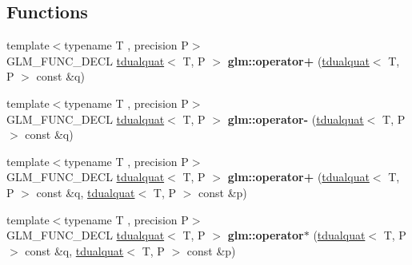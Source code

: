 \subsection*{Functions}
\begin{DoxyCompactItemize}
\item 
\mbox{\label{group__gtx__dual__quaternion_gaf14cf93205560472618c9f93a52a2e1f}} 
{\footnotesize template$<$typename T , precision P$>$ }\\G\+L\+M\+\_\+\+F\+U\+N\+C\+\_\+\+D\+E\+CL \hyperlink{structglm_1_1tdualquat}{tdualquat}$<$ T, P $>$ {\bfseries glm\+::operator+} (\hyperlink{structglm_1_1tdualquat}{tdualquat}$<$ T, P $>$ const \&q)
\item 
\mbox{\label{group__gtx__dual__quaternion_ga90a25279ac4f392a823e8bf6dfaddb9b}} 
{\footnotesize template$<$typename T , precision P$>$ }\\G\+L\+M\+\_\+\+F\+U\+N\+C\+\_\+\+D\+E\+CL \hyperlink{structglm_1_1tdualquat}{tdualquat}$<$ T, P $>$ {\bfseries glm\+::operator-\/} (\hyperlink{structglm_1_1tdualquat}{tdualquat}$<$ T, P $>$ const \&q)
\item 
\mbox{\label{group__gtx__dual__quaternion_ga9d7cfca38c6ff90757705600da3c7972}} 
{\footnotesize template$<$typename T , precision P$>$ }\\G\+L\+M\+\_\+\+F\+U\+N\+C\+\_\+\+D\+E\+CL \hyperlink{structglm_1_1tdualquat}{tdualquat}$<$ T, P $>$ {\bfseries glm\+::operator+} (\hyperlink{structglm_1_1tdualquat}{tdualquat}$<$ T, P $>$ const \&q, \hyperlink{structglm_1_1tdualquat}{tdualquat}$<$ T, P $>$ const \&p)
\item 
\mbox{\label{group__gtx__dual__quaternion_ga2c224f87242fe82e8ebc17f01aa51126}} 
{\footnotesize template$<$typename T , precision P$>$ }\\G\+L\+M\+\_\+\+F\+U\+N\+C\+\_\+\+D\+E\+CL \hyperlink{structglm_1_1tdualquat}{tdualquat}$<$ T, P $>$ {\bfseries glm\+::operator$\ast$} (\hyperlink{structglm_1_1tdualquat}{tdualquat}$<$ T, P $>$ const \&q, \hyperlink{structglm_1_1tdualquat}{tdualquat}$<$ T, P $>$ const \&p)
\item 
\mbox{\label{group__gtx__dual__quaternion_gaf956b8ca78fd9d2e668ae9a57143ed85}} 

\end{DoxyCompactItemize}
